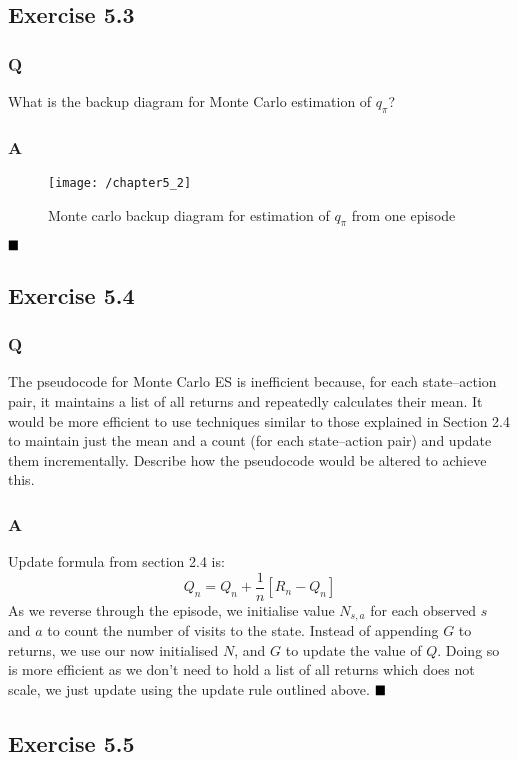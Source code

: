 \subsection{Exercise 5.3}
\subsubsection{Q}
What is the backup diagram for Monte Carlo estimation of $q_\pi$?
\subsubsection{A}
\begin{figure}[h!]
	\centering
	\texttt{[image: /chapter5\_2]}
	\caption{Monte carlo backup diagram for estimation of $q_\pi$ from one episode}
	\label{fig:monte carlo qpi}
\end{figure}
$
\hfill \blacksquare
$

\subsection{Exercise 5.4}
\subsubsection{Q}
The pseudocode for Monte Carlo ES is inefficient because, for each state–action pair, it maintains a list of all returns and repeatedly calculates their mean. It would be more efficient to use techniques similar to those explained in Section 2.4 to maintain just the mean and a count (for each state–action pair) and update them incrementally. Describe how the pseudocode would be altered to achieve this.
\subsubsection{A}
Update formula from section 2.4 is:
\begin{equation}
	Q_n = Q_n + \frac{1}{n}\left[R_n - Q_n\right]
\end{equation}
As we reverse through the episode, we initialise value $N_{s,a}$ for each observed $s$ and $a$ to count the number of visits to the state. Instead of appending $G$ to returns, we use our now initialised $N$, and $G$ to update the value of $Q$. Doing so is more efficient as we don't need to hold a list of all returns which does not scale, we just update using the update rule outlined above.
$
\hfill \blacksquare
$

\subsection{Exercise 5.5}
